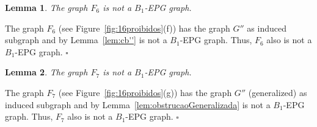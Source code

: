 \documentclass[9pt]{entcs}
\newtheorem{lema}{Lemma}[section]
\begin{document}




\begin{lema}\label{lem:f6}
The graph $F_{6}$ is not a $B_1$-EPG graph. 
\end{lema}

\begin{pf}
The graph $F_6$ (see Figure~\ref{fig:16proibidos}(f)) has the graph $G''$ as induced subgraph and by Lemma~\ref{lem:cb''} is not a $B_1$-EPG graph. Thus, $F_6$ also is not a $B_1$-EPG graph.
%
 $\square$\end{pf} 

\begin{lema}\label{lem:f7}
The graph $F_{7}$ is not a  $B_1$-EPG graph. 
\end{lema}

\begin{pf}
The graph $F_7$ (see Figure~\ref{fig:16proibidos}(g)) has the graph $G''$ (generalized) as induced subgraph and by Lemma~\ref{lem:obstrucaoGeneralizada} is not a $B_1$-EPG graph. Thus, $F_7$ also is not a $B_1$-EPG graph.
%
 $\square$\end{pf} 
\end{document}
